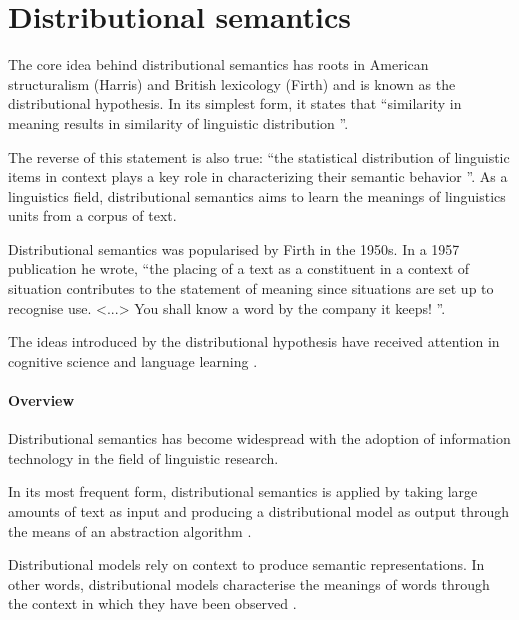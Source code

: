 \documentclass[14pt, a4paper]{extreport}
\begin{document}
  \section{Distributional semantics}
The core idea behind distributional semantics has roots in American structuralism (Harris) and British lexicology (Firth) and is known as the distributional hypothesis. In its simplest form, it states that ``similarity in meaning results in similarity of linguistic distribution \parencite{harris}''.

The reverse of this statement is also true: ``the statistical distribution of linguistic items in context plays a key role in characterizing their semantic behavior \parencite{lenci}''. As a linguistics field, distributional semantics aims to learn the meanings of linguistics units from a corpus of text.

Distributional semantics was popularised by Firth in the 1950s. In a 1957 publication he wrote, ``the placing of a text as a constituent in a context of situation contributes to the statement of meaning since situations are set up to recognise use. <...> You shall know a word by the company it keeps! \parencite[11]{firth}''.

The ideas introduced by the distributional hypothesis have received attention in cognitive science \parencite{mcdonald} and language learning \parencite{yarlett}.
        \paragraph{Overview}
Distributional semantics has become widespread with the adoption of information technology in the field of linguistic research.

In its most frequent form, distributional semantics is applied by taking large amounts of text as input and producing a distributional model as output through the means of an abstraction algorithm \parencite{emerson}.

Distributional models rely on context to produce semantic representations. In other words, distributional models characterise the meanings of words through the context in which they have been observed \parencite{erkkatrin2}.
\end{document}
